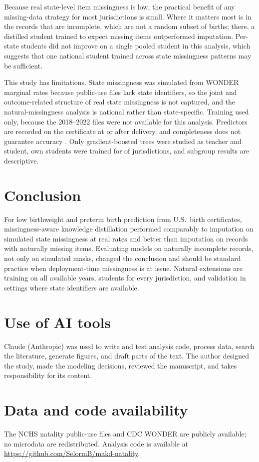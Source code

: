 \documentclass[11pt]{article}
\begin{document}
Because real state-level item missingness is low, the practical benefit of any missing-data strategy for most jurisdictions is small. Where it matters most is in the records that are incomplete, which are not a random subset of births; there, a distilled student trained to expect missing items outperformed imputation. Per-state students did not improve on a single pooled student in this analysis, which suggests that one national student trained across state missingness patterns may be sufficient.

This study has limitations. State missingness was simulated from WONDER marginal rates because public-use files lack state identifiers, so the joint and outcome-related structure of real state missingness is not captured, and the natural-missingness analysis is national rather than state-specific. Training used \TrainYears{} only, because the 2018--2022 files were not available for this analysis. Predictors are recorded on the certificate at or after delivery, and completeness does not guarantee accuracy \citep{martin2013}. Only gradient-boosted trees were studied as teacher and student, own students were trained for \NStateStudents{} of \NStates{} jurisdictions, and subgroup results are descriptive.

\section{Conclusion}\label{sec:conclusion}

For low birthweight and preterm birth prediction from U.S.\ birth certificates, missingness-aware knowledge distillation performed comparably to imputation on simulated state missingness at real rates and better than imputation on records with naturally missing items. Evaluating models on naturally incomplete records, not only on simulated masks, changed the conclusion and should be standard practice when deployment-time missingness is at issue. Natural extensions are training on all available years, students for every jurisdiction, and validation in settings where state identifiers are available.

\section*{Use of AI tools}

Claude (Anthropic) was used to write and test analysis code, process data, search the literature, generate figures, and draft parts of the text. The author designed the study, made the modeling decisions, reviewed the manuscript, and takes responsibility for its content.

\section*{Data and code availability}

The NCHS natality public-use files and CDC WONDER are publicly available; no microdata are redistributed. Analysis code is available at \url{https://github.com/SelormB/makd-natality}.



\end{document}
